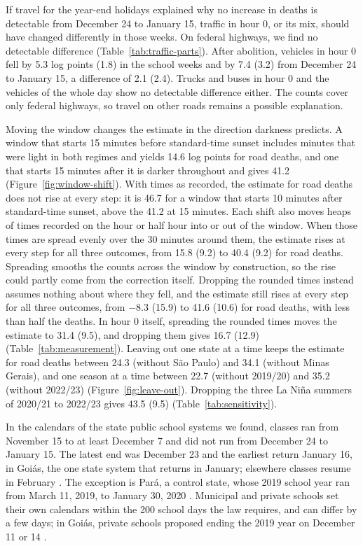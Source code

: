 If travel for the year-end holidays explained why no increase in deaths is detectable from December 24 to January 15, traffic in hour 0, or its mix, should have changed differently in those weeks. On federal highways, we find no detectable difference (Table~\ref{tab:traffic-parts}). After abolition, vehicles in hour 0 fell by 5.3 log points (1.8) in the school weeks and by 7.4 (3.2) from December 24 to January 15, a difference of 2.1 (2.4). Trucks and buses in hour 0 and the vehicles of the whole day show no detectable difference either. The counts cover only federal highways, so travel on other roads remains a possible explanation. %

Moving the window changes the estimate in the direction darkness predicts. A window that starts 15 minutes before standard-time sunset includes minutes that were light in both regimes and yields 14.6 log points for road deaths, and one that starts 15 minutes after it is darker throughout and gives 41.2 (Figure~\ref{fig:window-shift}). With times as recorded, the estimate for road deaths does not rise at every step: it is 46.7 for a window that starts 10 minutes after standard-time sunset, above the 41.2 at 15 minutes. Each shift also moves heaps of times recorded on the hour or half hour into or out of the window. When those times are spread evenly over the 30 minutes around them, the estimate rises at every step for all three outcomes, from 15.8 (9.2) to 40.4 (9.2) for road deaths. Spreading smooths the counts across the window by construction, so the rise could partly come from the correction itself. Dropping the rounded times instead assumes nothing about where they fell, and the estimate still rises at every step for all three outcomes, from $-8.3$ (15.9) to 41.6 (10.6) for road deaths, with less than half the deaths. In hour 0 itself, spreading the rounded times moves the estimate to 31.4 (9.5), and dropping them gives 16.7 (12.9) (Table~\ref{tab:measurement}). Leaving out one state at a time keeps the estimate for road deaths between 24.3 (without S\~ao Paulo) and 34.1 (without Minas Gerais), and one season at a time between 22.7 (without 2019/20) and 35.2 (without 2022/23) (Figure~\ref{fig:leave-out}). Dropping the three La Ni\~na summers of 2020/21 to 2022/23 gives 43.5 (9.5) (Table~\ref{tab:sensitivity}).

In the calendars of the state public school systems we found, classes ran from November 15 to at least December 7 and did not run from December 24 to January 15. The latest end was December 23 and the earliest return January 16, in Goi\'as, the one state system that returns in January; elsewhere classes resume in February \citep{saopaulo2018resolucao, goias2018parecer, minas2023ano}. The exception is Par\'a, a control state, whose 2019 school year ran from March 11, 2019, to January 30, 2020 \citep{para2018calendario}. Municipal and private schools set their own calendars within the 200 school days the law requires, and can differ by a few days; in Goi\'as, private schools proposed ending the 2019 year on December 11 or 14 \citep{goias2018parecer}.


